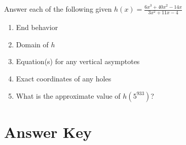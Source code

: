 
Answer each of the following given $h(x) = \frac{6x^3+40x^2-14x}{3x^2+11x-4}$
\begin{enumerate}	\setcounter{enumi}{\value{Review}}
	\item End behavior
	\item Domain of $h$
	\item Equation(s) for any vertical asymptotes
	\item Exact coordinates of any holes
	\item What is the approximate value of $h\!\left(5^{933}\right)$?
\end{enumerate}	\setcounter{Review}{\value{enumi}}

\newpage

\section{Answer Key}

